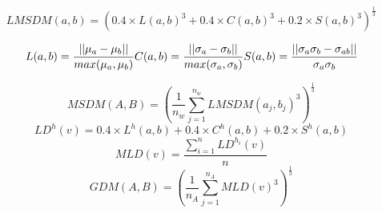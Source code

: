 
\begin{equation}
LMSDM(a,b) = (0.4\times L(a,b)^3+0.4\times C(a,b)^3+0.2\times S(a,b)^3)^{\frac{1}{3}}
\end{equation}

\begin{equation}
 L(a,b) = \frac{||\mu_a-\mu_b||}{max(\mu_a, \mu_b)}\\
 C(a,b) = \frac{||\sigma_a-\sigma_b||}{max(\sigma_a, \sigma_b)}\\
 S(a,b) = \frac{||\sigma_a\sigma_b -\sigma_{ab}||}{\sigma_a\sigma_b}
\end{equation}

\begin{equation}
MSDM(A,B) = (\frac{1}{n_w} \sum_{j=1}^{n_w}{LMSDM(a_j,b_j)^3})^{\frac{1}{3}}
\end{equation}
\begin{equation}
LD^h(v) = 0.4\times L^h(a,b)+0.4\times C^h(a,b)+0.2\times S^h(a,b)
\end{equation}
\begin{equation}
MLD(v) = \frac{\sum_{i=1}^n{LD^{h_i}(v)}}{n}
\end{equation}
\begin{equation}
GDM(A,B) = (\frac{1}{n_A} \sum_{j=1}^{n_A}{MLD(v)^3})^{\frac{1}{3}}
\end{equation}